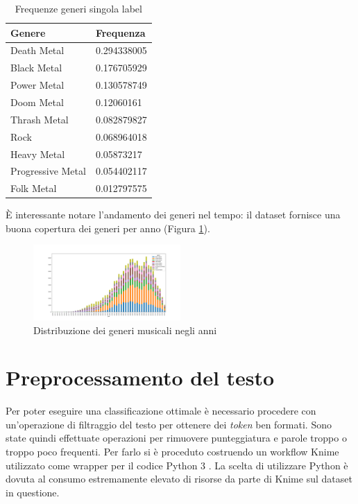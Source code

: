 \documentclass[technote]{IEEEtran}
\begin{document}
\begin{table}[H]
\centering
\caption{Frequenze generi singola label}
\begin{tabular}{|l|l|}
\hline
\textbf{Genere}   & \textbf{Frequenza} \\ \hline
Death Metal       & 0.294338005        \\ \hline
Black Metal       & 0.176705929        \\ \hline
Power Metal       & 0.130578749        \\ \hline
Doom Metal        & 0.12060161         \\ \hline
Thrash Metal      & 0.082879827        \\ \hline
Rock              & 0.068964018        \\ \hline
Heavy Metal       & 0.05873217         \\ \hline
Progressive Metal & 0.054402117        \\ \hline
Folk Metal        & 0.012797575        \\ \hline
\end{tabular}
\label{t_single_genre}
\end{table}
\`E interessante notare l'andamento dei generi nel tempo: il dataset
fornisce una buona copertura dei generi per anno (Figura \ref{fig_genre_year}).


\begin{figure}[H]
\centerline{\includegraphics[width=0.5\textwidth]{images/genre_per_year_distribution}}
\caption{Distribuzione dei generi musicali negli anni}
\label{fig_genre_year}
\end{figure}

\section{Preprocessamento del testo}
Per poter eseguire una classificazione
ottimale è necessario procedere con un'operazione di filtraggio
del testo per ottenere dei \textit{token} ben formati.
Sono state quindi effettuate operazioni per rimuovere punteggiatura e
parole troppo o troppo poco frequenti.
Per farlo si è proceduto costruendo un workflow Knime
\cite{10.1007/978-3-540-78246-9_38}
utilizzato come wrapper per il codice Python 3 \cite{10.5555/1593511}.
La scelta di utilizzare Python è dovuta al consumo estremamente elevato
di risorse da parte di Knime sul dataset in questione.
\end{document}
